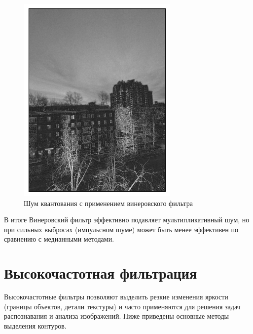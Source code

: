 \documentclass[a4paper,12pt]{article}
\begin{document}
\begin{figure}[H]
\begin{minipage}{0.49\textwidth}
        \centering \includegraphics[width=\textwidth]{results/nlf_pois_6.png}
        \caption{Шум квантования с применением винеровского фильтра}
    \end{minipage}
\end{figure}
\noindent
В итоге Винеровский фильтр эффективно подавляет мультипликативный шум, но при сильных выбросах (импульсном шуме) может быть менее эффективен по сравнению с медианными методами.
\section{Высокочастотная фильтрация}
Высокочастотные фильтры позволяют выделить резкие изменения яркости (границы объектов, детали текстуры) и часто применяются для решения задач распознавания и анализа изображений. Ниже приведены основные методы выделения контуров.
\end{document}
